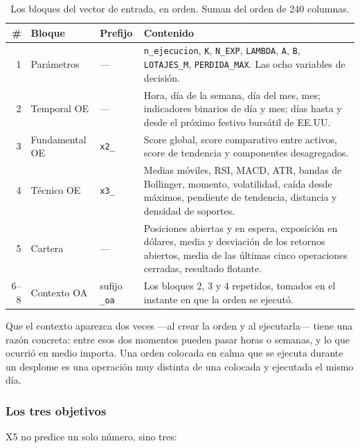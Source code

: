 \documentclass[11pt,a4paper]{article}
\newcommand{\code}[1]{\texttt{\small #1}}
\newcommand{\bigsep}{\par\vspace{3pt}}
\begin{document}
\begin{table}[h]
\centering
\small
\begin{tabularx}{\linewidth}{@{}r l l X@{}}
\toprule
\textbf{\#} & \textbf{Bloque} & \textbf{Prefijo} & \textbf{Contenido} \\
\midrule
1 & Parámetros & --- & \code{n_ejecucion}, \code{K}, \code{N_EXP}, \code{LAMBDA}, \code{A}, \code{B}, \code{LOTAJES_M}, \code{PERDIDA_MAX}. Las ocho variables de decisión. \\
2 & Temporal OE & --- & Hora, día de la semana, día del mes, mes; indicadores binarios de día y mes; días hasta y desde el próximo festivo bursátil de EE.UU. \\
3 & Fundamental OE & \code{x2_} & Score global, score comparativo entre activos, score de tendencia y componentes desagregados. \\
4 & Técnico OE & \code{x3_} & Medias móviles, RSI, MACD, ATR, bandas de Bollinger, momento, volatilidad, caída desde máximos, pendiente de tendencia, distancia y densidad de soportes. \\
5 & Cartera & --- & Posiciones abiertas y en espera, exposición en dólares, media y desviación de los retornos abiertos, media de las últimas cinco operaciones cerradas, resultado flotante. \\
6--8 & Contexto OA & sufijo \code{_oa} & Los bloques 2, 3 y 4 repetidos, tomados en el instante en que la orden se ejecutó. \\
\bottomrule
\end{tabularx}
\caption{Los bloques del vector de entrada, en orden. Suman del orden de 240 columnas.}
\end{table}

\bigsep
Que el contexto aparezca dos veces —al crear la orden y al ejecutarla— tiene una razón
concreta: entre esos dos momentos pueden pasar horas o semanas, y lo que ocurrió en medio
importa. Una orden colocada en calma que se ejecuta durante un desplome es una operación
muy distinta de una colocada y ejecutada el mismo día.

\subsubsection{Los tres objetivos}

X5 no predice un solo número, sino tres:
\end{document}
